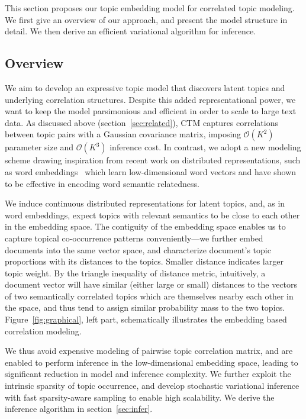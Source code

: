 \documentclass[sigconf]{acmart}
\begin{document}
This section proposes our topic embedding model for correlated topic modeling. We first give an overview of our approach, and present the model structure in detail. We then derive an efficient variational algorithm for inference.  

\subsection{Overview}
We aim to develop an expressive topic model that discovers latent topics and underlying correlation structures. Despite this added representational power, we want to keep the model parsimonious and efficient in order to scale to large text data. As discussed above (section~\ref{sec:related}), CTM captures correlations between topic pairs with a Gaussian covariance matrix, imposing $\mathcal{O}(K^2)$ parameter size and $\mathcal{O}(K^3)$ inference cost. In contrast, we adopt a new modeling scheme drawing inspiration from recent work on distributed representations, such as word embeddings~\cite{mikolov2013distributed} which learn low-dimensional word vectors and have shown to be effective in encoding word semantic relatedness.

We induce continuous distributed representations for latent topics, and, as in word embeddings, expect topics with relevant semantics to be close to each other in the embedding space. The contiguity of the embedding space enables us to capture topical co-occurrence patterns conveniently---we further embed documents into the same vector space, and characterize document's topic proportions with its distances to the topics. Smaller distance indicates larger topic weight. By the triangle inequality of distance metric, intuitively, a document vector will have similar (either large or small) distances to the vectors of two semantically correlated topics which are themselves nearby each other in the space, and thus tend to assign similar probability mass to the two topics. Figure~\ref{fig:graphical}, left part, schematically illustrates the embedding based correlation modeling.

We thus avoid expensive modeling of pairwise topic correlation matrix, and are enabled to perform inference in the low-dimensional embedding space, leading to significant reduction in model and inference complexity. We further exploit the intrinsic sparsity of topic occurrence, and develop stochastic variational inference with fast sparsity-aware sampling to enable high scalability. We derive the inference algorithm in section~\ref{sec:infer}. 
\end{document}
